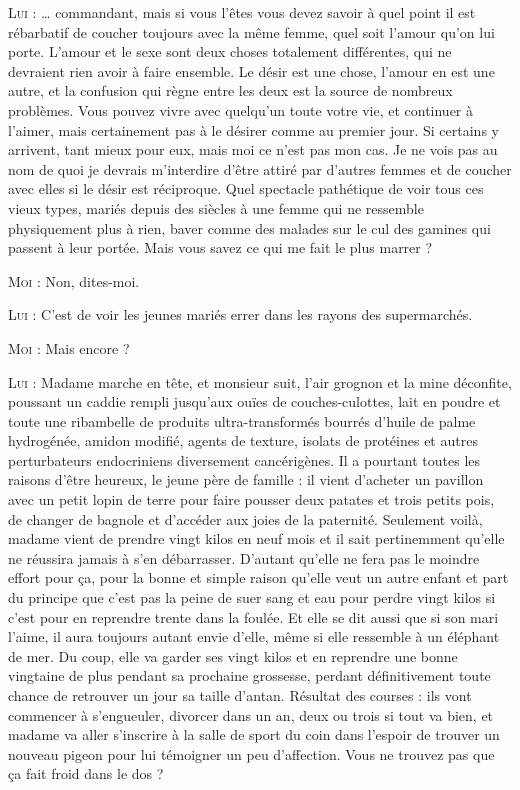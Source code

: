 \begin{dialogue}
\textsc{Lui} : … commandant, mais si vous l’êtes vous devez savoir à quel point il est rébarbatif de coucher toujours avec la même femme, quel soit l’amour qu’on lui porte. L’amour et le sexe sont deux choses totalement différentes, qui ne devraient rien avoir à faire ensemble. Le désir est une chose, l’amour en est une autre, et la confusion qui règne entre les deux est la source de nombreux problèmes. Vous pouvez vivre avec quelqu’un toute votre vie, et continuer à l’aimer, mais certainement pas à le désirer comme au premier jour. Si certains y arrivent, tant mieux pour eux, mais moi ce n’est pas mon cas. Je ne vois pas au nom de quoi je devrais m’interdire d’être attiré par d’autres femmes et de coucher avec elles si le désir est réciproque. Quel spectacle pathétique de voir tous ces vieux types, mariés depuis des siècles à une femme qui ne ressemble physiquement plus à rien, baver comme des malades sur le cul des gamines qui passent à leur portée. Mais vous savez ce qui me fait le plus marrer ?

\textsc{Moi} : Non, dites-moi.

\textsc{Lui} : C’est de voir les jeunes mariés errer dans les rayons des supermarchés.

\textsc{Moi} : Mais encore ?

\textsc{Lui} : Madame marche en tête, et monsieur suit, l’air grognon et la mine déconfite, poussant un caddie rempli jusqu’aux ouïes de couches-culottes, lait en poudre et toute une ribambelle de produits ultra-transformés bourrés d’huile de palme hydrogénée, amidon modifié, agents de texture, isolats de protéines et autres perturbateurs endocriniens diversement cancérigènes. Il a pourtant toutes les raisons d’être heureux, le jeune père de famille : il vient d’acheter un pavillon avec un petit lopin de terre pour faire pousser deux patates et trois petits pois, de changer de bagnole et d’accéder aux joies de la paternité. Seulement voilà, madame vient de prendre vingt kilos en neuf mois et il sait pertinemment qu’elle ne réussira jamais à s’en débarrasser. D’autant qu’elle ne fera pas le moindre effort pour ça, pour la bonne et simple raison qu’elle veut un autre enfant et part du principe que c’est pas la peine de suer sang et eau pour perdre vingt kilos si c’est pour en reprendre trente dans la foulée. Et elle se dit aussi que si son mari l’aime, il aura toujours autant envie d’elle, même si elle ressemble à un éléphant de mer. Du coup, elle va garder ses vingt kilos et en reprendre une bonne vingtaine de plus pendant sa prochaine grossesse, perdant définitivement toute chance de retrouver un jour sa taille d’antan. Résultat des courses : ils vont commencer à s’engueuler, divorcer dans un an, deux ou trois si tout va bien, et madame va aller s’inscrire à la salle de sport du coin dans l’espoir de trouver un nouveau pigeon pour lui témoigner un peu d’affection. Vous ne trouvez pas que ça fait froid dans le dos ?


\end{dialogue}
